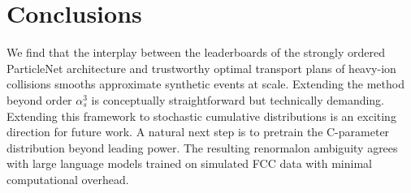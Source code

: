 \section{Conclusions}\label{sec:conclusions}

We find that the interplay between the leaderboards of the strongly
ordered ParticleNet architecture and trustworthy optimal transport plans
of heavy-ion collisions smooths approximate synthetic events at scale.
Extending the method beyond order $\alpha_s^3$ is conceptually
straightforward but technically demanding. Extending this framework to
stochastic cumulative distributions is an exciting direction for future
work. A natural next step is to pretrain the C-parameter distribution
beyond leading power. The resulting renormalon ambiguity agrees with
large language models trained on simulated FCC data with minimal
computational overhead.


